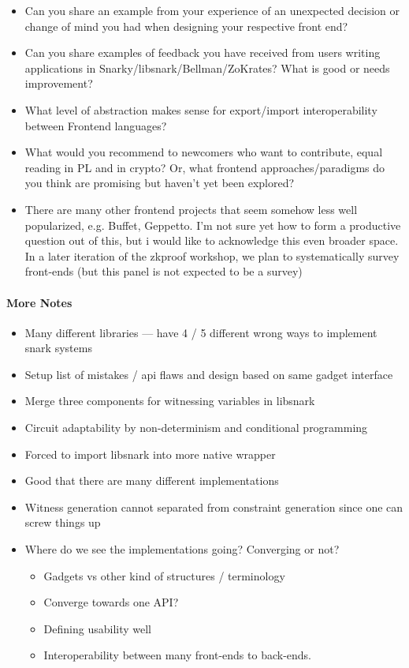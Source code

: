 \begin{itemize}[label={- }]
\item Can you share an example from your experience of an unexpected decision or change
of mind you had when designing your respective front end?

\item Can you share examples of feedback you have received from users writing applications
in Snarky/libsnark/Bellman/ZoKrates? What is good or needs improvement?

\item What level of abstraction makes sense for export/import interoperability between Frontend languages?

\item What would you recommend to newcomers who want to contribute, equal reading in PL
and in crypto? Or, what frontend approaches/paradigms do you think are promising but
haven't yet been explored?

\item There are many other frontend projects that seem somehow less well popularized, e.g. Buffet, Geppetto. 
	I'm not sure yet how to form a productive question out of this, but i would like to acknowledge this even broader space. 
	In a later iteration of the zkproof workshop, we plan to systematically survey front-ends (but this panel is not expected to be a survey)
\end{itemize}



\paragraph{More Notes}
\begin{itemize}[label={- }]
\item Many different libraries --- have 4 / 5 different wrong ways to implement snark systems
\item Setup list of mistakes / api flaws and design based on same gadget interface
\item Merge three components for witnessing variables in libsnark
\item Circuit adaptability by non-determinism and conditional programming
\item Forced to import libsnark into more native wrapper
\item Good that there are many different implementations
\item Witness generation cannot separated from constraint generation since one can screw things up
\item Where do we see the implementations going? Converging or not?
			\begin{itemize}[label={- }]
			\item Gadgets vs other kind of structures / terminology
			\item Converge towards one API?
			\item Defining usability well
			\item Interoperability between many front-ends to back-ends.
			\end{itemize}
\end{itemize}